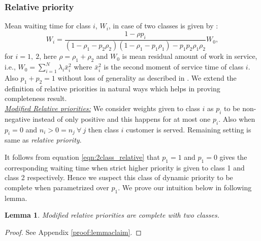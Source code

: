 \documentclass[a4paper,12pt]{article}
\newtheorem{lem}[thm]{Lemma}
\begin{document}
\subsubsection{\textbf{Relative priority}} Mean waiting time for class $i$, $W_i$, in case of two classes is given by \cite{haviv2}: 
\begin{equation}\label{eqn:2class_relative}
W_i = \dfrac{1-\rho p_i}{(1- \rho_1 - p_2 \rho_2)(1 - \rho_1 - p_1\rho_1)-p_1 p_2 \rho_1\rho_2}W_0, 
\end{equation}   
 for $i=1,~2$, here $\rho = \rho_1 + \rho_2$ and $W_0$ is mean residual amount of work in service, i.e., $W_0 = \sum_{i=1}^N\lambda_i \bar{x}_i^2$ where $\bar{x}_i^2$ is the second moment of service time of class $i$. Also $p_1+p_2 = 1$ without loss of generality as described in \cite{haviv2}. We extend the definition of relative priorities in natural ways which helps in proving completeness result.\\
\indent \textit{\underline{Modified Relative priorities:}} We consider weights given to class $i$ as $p_i$ to be non-negative instead of only positive and this happens for at most one $p_i$. Also when $p_i = 0$ and $n_i > 0 = n_j~\forall~j$ then class $i$ customer is served. Remaining setting is same as \textit{relative priority}.

 It follows from equation \ref{eqn:2class_relative} that $p_1 = 1$ and $p_1 = 0$ gives the corresponding waiting time when strict higher priority is given to class 1 and class 2 respectively. Hence we suspect this class of dynamic priority to be complete when parametrized over $p_1$. We prove our intuition below in following lemma.
 
\begin{lem}\label{clm:relprt2cls}
\textit{Modified relative priorities are complete with two classes.}
\end{lem}
\begin{proof}
 See Appendix \ref{proof:lemmaclaim}.
\end{proof}
\end{document}
